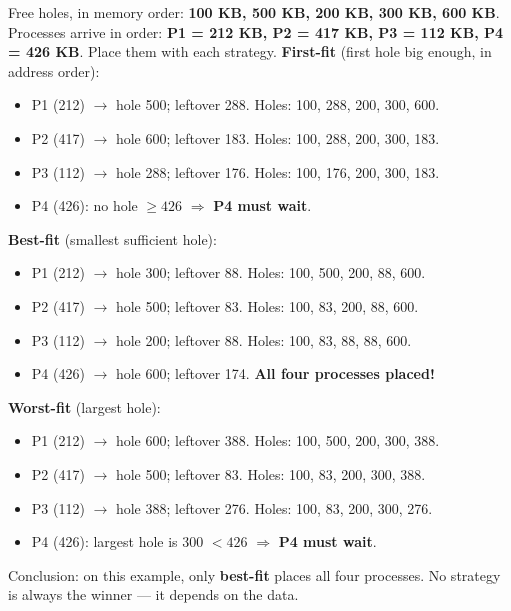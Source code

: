 \documentclass[11pt]{article}
\begin{document}
\begin{exoresolu}
Free holes, in memory order: \textbf{100 KB, 500 KB, 200 KB, 300 KB, 600 KB}. Processes arrive in order: \textbf{P1 = 212 KB, P2 = 417 KB, P3 = 112 KB, P4 = 426 KB}. Place them with each strategy.
\tcblower
\textbf{First-fit} (first hole big enough, in address order):
\begin{itemize}
\item P1 (212) $\to$ hole 500; leftover 288. Holes: 100, 288, 200, 300, 600.
\item P2 (417) $\to$ hole 600; leftover 183. Holes: 100, 288, 200, 300, 183.
\item P3 (112) $\to$ hole 288; leftover 176. Holes: 100, 176, 200, 300, 183.
\item P4 (426): no hole $\geq 426$ $\Rightarrow$ \textbf{P4 must wait}.
\end{itemize}
\textbf{Best-fit} (smallest sufficient hole):
\begin{itemize}
\item P1 (212) $\to$ hole 300; leftover 88. Holes: 100, 500, 200, 88, 600.
\item P2 (417) $\to$ hole 500; leftover 83. Holes: 100, 83, 200, 88, 600.
\item P3 (112) $\to$ hole 200; leftover 88. Holes: 100, 83, 88, 88, 600.
\item P4 (426) $\to$ hole 600; leftover 174. \textbf{All four processes placed!}
\end{itemize}
\textbf{Worst-fit} (largest hole):
\begin{itemize}
\item P1 (212) $\to$ hole 600; leftover 388. Holes: 100, 500, 200, 300, 388.
\item P2 (417) $\to$ hole 500; leftover 83. Holes: 100, 83, 200, 300, 388.
\item P3 (112) $\to$ hole 388; leftover 276. Holes: 100, 83, 200, 300, 276.
\item P4 (426): largest hole is 300 $< 426$ $\Rightarrow$ \textbf{P4 must wait}.
\end{itemize}
Conclusion: on this example, only \textbf{best-fit} places all four processes. No strategy is always the winner — it depends on the data.
\end{exoresolu}
\end{document}
